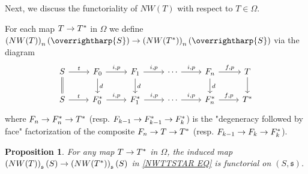 \documentclass[a4paper,10pt
,draft
]{article}%
\numberwithin{equation}{section}
\numberwithin{figure}{section}
\newtheorem{proposition}[equation]{Proposition}%
\theoremstyle{definition} %
\newcommand{\vect}[1]{\text{\overrightharp{\ensuremath{#1}}}}
\newcommand{\1}{\ensuremath{\mathbbm 1}}%
\begin{document}
Next, we discuss the functoriality of
$NW(T)$ with respect to $T \in \Omega$.

For each map $T \to T^{\**}$ in $\Omega$
we define
$\left(NW(T)\right)_n(\vect{S})
\to 
\left(NW(T^{\**})\right)_n(\vect{S})$
via the diagram
\begin{equation}\label{NWTTSTAR EQ}
\begin{tikzcd}
	S \ar{r}{t} \ar[equal]{d}
&
	F_0 \ar{r}{i,p} \ar{d}{d}
&
	F_1 \ar{r}{i,p} \ar{d}{d}
&
	\cdots \ar{r}{i,p}
&
	F_n \ar{r}{f,p} \ar{d}{d}
&
	T \ar{d}
\\
	S \ar{r}{t} 
&
	F^{\**}_0 \ar{r}{i,p}
&
	F^{\**}_1 \ar{r}{i,p}
&
	\cdots \ar{r}{i,p}
&
	F^{\**}_n \ar{r}{f,p}
&
	T^{\**}
\end{tikzcd}
\end{equation}
where
$F_n \to F^{\**}_n \to T^{\**}$
(resp. 
$F_{k-1} \to F^{\**}_{k-1} \to F^{\**}_k$)
is the "degeneracy followed by face"
factorization of the composite
$F_n \to T \to T^{\**}$
(resp.
$F_{k-1} \to F_{k} \to F^{\**}_k$).






\begin{proposition}
	For any map $T \to T^{\**}$ in $\Omega$, the induced map
	$\left(NW(T)\right)_{\mathfrak{s}}(S)
	\to 
	\left(NW(T^{\**})\right)_{\mathfrak{s}}(S)$
	in 
	\eqref{NWTTSTAR EQ}
	is functorial on $(S,\mathfrak{s})$.
\end{proposition}
\end{document}
